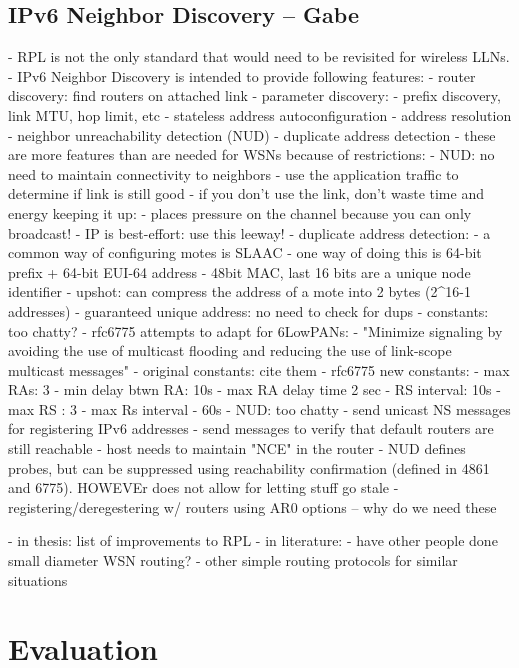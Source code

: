 \documentclass[conference]{IEEEtran}
\begin{document}
\subsection{IPv6 Neighbor Discovery -- Gabe }
- RPL is not the only standard that would need to be revisited for wireless LLNs.
- IPv6 Neighbor Discovery is intended to provide following features:
    - router discovery: find routers on attached link
    - parameter discovery:
        - prefix discovery, link MTU, hop limit, etc
    - stateless address autoconfiguration
    - address resolution
    - neighbor unreachability detection (NUD)
    - duplicate address detection
- these are more features than are needed for WSNs because of restrictions:
    - NUD: no need to maintain connectivity to neighbors
        - use the application traffic to determine if link is still good
        - if you don't use the link, don't waste time and energy keeping it up:
            - places pressure on the channel because you can only broadcast!
        - IP is best-effort: use this leeway!
    - duplicate address detection:
        - a common way of configuring motes is SLAAC
        - one way of doing this is 64-bit prefix + 64-bit EUI-64 address
        - 48bit MAC, last 16 bits are a unique node identifier
        - upshot: can compress the address of a mote into 2 bytes (2^16-1 addresses)
        - guaranteed unique address: no need to check for dups
- constants: too chatty?
    - rfc6775 attempts to adapt for 6LowPANs:
    - "Minimize signaling by avoiding the use of multicast
      flooding and reducing the use of link-scope multicast messages"
    - original constants: cite them
    - rfc6775 new constants:
        - max RAs: 3
        - min delay btwn RA: 10s
        - max RA delay time 2 sec
        - RS interval: 10s
        - max RS : 3
        - max Rs interval - 60s
- NUD: too chatty
    - send unicast NS messages for registering IPv6 addresses
    - send messages to verify that default routers are still reachable
    - host needs to maintain "NCE" in the router
    - NUD defines probes, but can be suppressed using reachability confirmation
      (defined in 4861 and 6775). HOWEVEr does not allow for letting stuff go stale
    - registering/deregestering w/ routers using AR0 options -- why do we need these
\fi


- in thesis: list of improvements to RPL
- in literature:
    - have other people done small diameter WSN routing?
    - other simple routing protocols for similar situations
\fi





\section{Evaluation} \label{section:evaluation}



\end{document}
